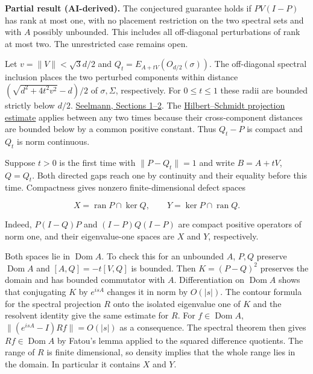 \documentclass[11pt,a4paper]{article}
\begin{document}
\textbf{Partial result (AI-derived).} The conjectured guarantee holds if
\(PV(I-P)\) has rank at most one, with no placement restriction on the
two spectral sets and with \(A\) possibly unbounded. This includes all
off-diagonal perturbations of rank at most two. The unrestricted case
remains open.

Let \(v=\|V\|<\sqrt3 d/2\) and \(Q_t=E_{A+tV}(O_{d/2}(\sigma))\). The
off-diagonal spectral inclusion places the two perturbed components
within distance \((\sqrt{d^2+4t^2v^2}-d)/2\) of \(\sigma,\Sigma\),
respectively. For \(0\le t\le1\) these radii are bounded strictly below
\(d/2\). \href{https://arxiv.org/pdf/1412.6294}{Seelmann, Sections
1--2}. The
\href{https://github.com/ajt60gaibb/OpenProblemsInNLA/blob/main/eigenvalues-and-inverse-problems/SP-01/README.md\#sharp-threshold-for-rank-two-perturbations--2026-11-28}{Hilbert--Schmidt
projection estimate} applies between any two times because their
cross-component distances are bounded below by a common positive
constant. Thus \(Q_t-P\) is compact and \(Q_t\) is norm continuous.

Suppose \(t>0\) is the first time with \(\|P-Q_t\|=1\) and write
\(B=A+tV\), \(Q=Q_t\). Both directed gaps reach one by continuity and
their equality before this time. Compactness gives nonzero
finite-dimensional defect spaces

\[X=\mathop{\mathrm{ran}}\nolimits P\cap\ker Q,\qquad
Y=\ker P\cap\mathop{\mathrm{ran}}\nolimits Q.\]

Indeed, \(P(I-Q)P\) and \((I-P)Q(I-P)\) are compact positive operators
of norm one, and their eigenvalue-one spaces are \(X\) and \(Y\),
respectively.

Both spaces lie in \(\mathop{\mathrm{Dom}}\nolimits A\). To check this
for an unbounded \(A\), \(P,Q\) preserve
\(\mathop{\mathrm{Dom}}\nolimits A\) and \([A,Q]=-t[V,Q]\) is bounded.
Then \(K=(P-Q)^2\) preserves the domain and has bounded commutator with
\(A\). Differentiation on \(\mathop{\mathrm{Dom}}\nolimits A\) shows
that conjugating \(K\) by \(e^{isA}\) changes it in norm by \(O(|s|)\).
The contour formula for the spectral projection \(R\) onto the isolated
eigenvalue one of \(K\) and the resolvent identity give the same
estimate for \(R\). For \(f\in\mathop{\mathrm{Dom}}\nolimits A\),
\(\|(e^{isA}-I)Rf\|=O(|s|)\) as a consequence. The spectral theorem then
gives \(Rf\in\mathop{\mathrm{Dom}}\nolimits A\) by Fatou's lemma applied
to the squared difference quotients. The range of \(R\) is finite
dimensional, so density implies that the whole range lies in the domain.
In particular it contains \(X\) and \(Y\).
\end{document}
